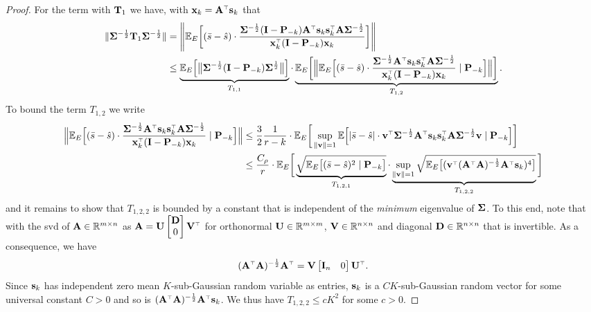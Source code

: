 \documentclass[11pt]{article}
\begin{document}
\begin{proof}
   For the term with $\mathbf{T}_1$ we have, with $\x_k = \A^\top \s_k$ that
\begin{align*}
      \| \Sigmab^{-\frac12} \T_1 \Sigmab^{-\frac12} \| &=  \left\| \E_E\bigg[(\bar s - \hat s)\cdot
            \frac{ \Sigmab^{-\frac12} ( \I - \P_{-k}) \A^\top \s_k\s_k^\top \A \Sigmab^{-\frac12} }{\x_k^\top ( \I - \P_{-k}) \x_k}\bigg] \right\|\\
      &\leq
     \underbrace{\E_E\Big[\big\|\Sigmab^{-\frac12} (\I - \P_{-k}) \Sigmab^{\frac12}\big\|\Big]}_{T_{1,1}}
     \cdot
     \underbrace{\E_E\bigg[\Big\|\E_E\Big[(\bar s- \hat s)\cdot
     \frac{\Sigmab^{-\frac12} \A^\top \s_k\s_k^\top \A \Sigmab^{-\frac12} }{\x_k^\top (\I - \P_{-k}) \x_k}\mid
     \P_{-k}\Big]\Big\|\bigg]}_{T_{1,2}}.
\end{align*}
To bound the term $T_{1,2}$ we write 
\begin{align*}
  \Big\|\E_E\Big[(\bar s- \hat s)\cdot
     \frac{\Sigmab^{-\frac12} \A^\top \s_k\s_k^\top \A \Sigmab^{-\frac12} }{\x_k^\top (\I - \P_{-k}) \x_k}\mid
     \P_{-k}\Big]\Big\| &\leq \frac32 \frac1{r-k} \cdot \E_E\bigg[\sup_{\| \v \| = 1}\E\Big[
            |\bar s-\hat s|\cdot \v^\top \Sigmab^{-\frac12} \A^\top \s_k \s_k^\top \A \Sigmab^{-\frac12} \v \mid
            \P_{-k}\Big]\bigg]
  \\
  &\leq \frac{C_\rho}{r}\cdot \E_E\bigg[\underbrace{\sqrt{\E_E\big[(\bar s-\hat
    s)^2 \mid\P_{-k}\big]}}_{ T_{1,2,1} }\cdot
    \underbrace{\sup_{ \| \v \| = 1 }\sqrt{\E_E\big[(\v^\top (\A^\top \A)^{-\frac12} \A^\top \s_k )^4\big]}}_{ T_{1,2,2} }\bigg]
\end{align*}
and it remains to show that $T_{1,2,2}$ is bounded by a constant that is independent of the \emph{minimum} eigenvalue of $\mathbf{\Sigma}$. To this end, note that with the svd of $\mathbf A \in \mathbb R^{m \times n}$ as $\A = \U \begin{bmatrix} \D \\ 0\end{bmatrix} \V^\top$ for orthonormal $\mathbf U \in \mathbb R^{m \times m}$, $\mathbf V \in \mathbb R^{n \times n}$ and diagonal $\mathbf D \in \mathbb R^{n \times n}$ that is invertible. As a consequence, we have
\[
  (\A^\top \A)^{-\frac12} \A^\top = \V \begin{bmatrix} \I_n & 0\end{bmatrix} \U^\top.
\]
Since $\mathbf{s}_k$ has independent zero mean $K$-sub-Gaussian random variable as entries, $\mathbf{s}_k$ is a $CK$-sub-Gaussian random vector \cite[Lemma~3.4.2]{vershynin2018high} for some universal constant $C> 0$ and so is $(\A^\top \A)^{-\frac12} \A^\top \s_k$. We thus have $T_{1,2,2} \le c K^2$ for some $c > 0$.


\end{proof}
\end{document}
